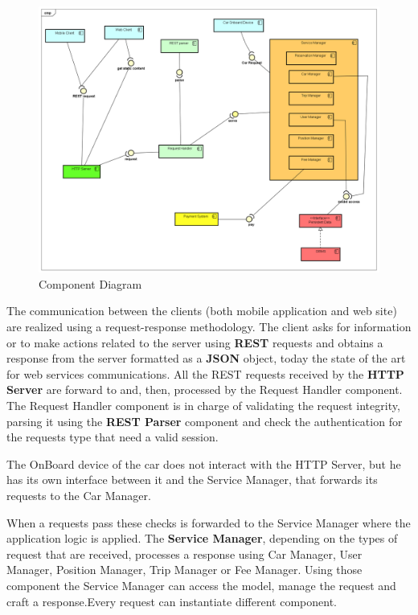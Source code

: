 \begin{figure}[H]	
	\centering
	\includegraphics[width=\textwidth]{img/Component_Diagram}
	\caption{Component Diagram}
\end{figure}

The communication between the clients (both mobile application and web site) are realized using a request-response methodology. The client asks for information or to make actions related to the server using \textbf{REST} requests and obtains a response from the server formatted as a \textbf{JSON} object, today the state of the art for web services communications. 
All the REST requests received by the \textbf{HTTP Server} are forward to and, then, processed by the Request Handler component. The Request Handler component is in charge of validating the request integrity, parsing it using the \textbf{REST Parser} component and check the authentication for the requests type that need a valid session.

The OnBoard device of the car does not interact with the HTTP Server, but he has its own interface between it and the Service Manager, that forwards its requests to the Car Manager.

When a requests pass these checks is forwarded to the Service Manager where the application logic is applied.
The \textbf{Service Manager}, depending on the types of request that are received,  processes a response using Car Manager, User Manager, Position Manager, Trip Manager or Fee Manager.
Using those component the Service Manager can access the model, manage the request and craft a response.Every request can instantiate different component.

